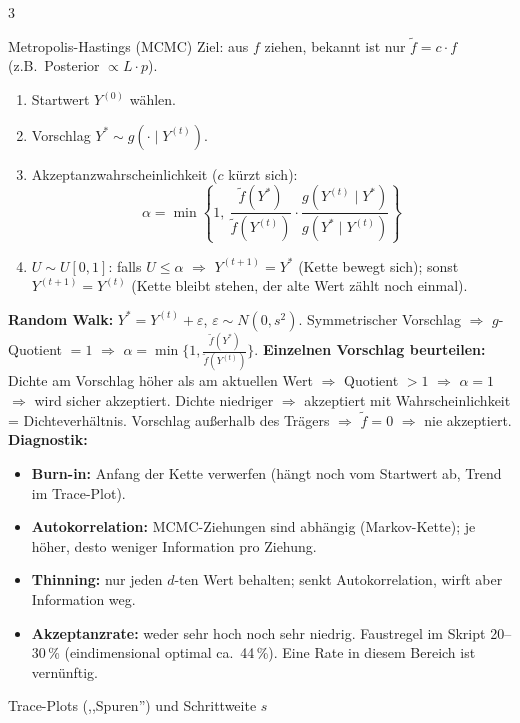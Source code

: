 \documentclass[8pt,a4paper,landscape]{extarticle}
\newcommand{\ra}{$\Rightarrow$}
\begin{document}
\begin{multicols*}{3}
\begin{wissen}{Metropolis-Hastings (MCMC)}
Ziel: aus $f$ ziehen, bekannt ist nur $\tilde f=c\cdot f$ (z.B.\ Posterior $\propto L\cdot p$).
\begin{enumerate}[leftmargin=10pt]
\item Startwert $Y^{(0)}$ wählen.
\item Vorschlag $Y^*\sim g(\cdot\mid Y^{(t)})$.
\item Akzeptanzwahrscheinlichkeit ($c$ kürzt sich):
$$\alpha=\min\left\{1,\ \frac{\tilde f(Y^*)}{\tilde f(Y^{(t)})}\cdot\frac{g(Y^{(t)}\mid Y^*)}{g(Y^*\mid Y^{(t)})}\right\}$$
\item $U\sim U[0,1]$: falls $U\le\alpha$ \ra{} $Y^{(t+1)}=Y^*$ (Kette bewegt sich); sonst $Y^{(t+1)}=Y^{(t)}$ (Kette bleibt stehen, der alte Wert zählt noch einmal).
\end{enumerate}
\textbf{Random Walk:} $Y^*=Y^{(t)}+\varepsilon$, $\varepsilon\sim N(0,s^2)$. Symmetrischer Vorschlag \ra{} $g$-Quotient $=1$ \ra{} $\alpha=\min\big\{1,\frac{\tilde f(Y^*)}{\tilde f(Y^{(t)})}\big\}$.
\textbf{Einzelnen Vorschlag beurteilen:} Dichte am Vorschlag höher als am aktuellen Wert \ra{} Quotient $>1$ \ra{} $\alpha=1$ \ra{} wird sicher akzeptiert. Dichte niedriger \ra{} akzeptiert mit Wahrscheinlichkeit = Dichteverhältnis. Vorschlag außerhalb des Trägers \ra{} $\tilde f=0$ \ra{} nie akzeptiert.
\textbf{Diagnostik:}
\begin{itemize}
\item \textbf{Burn-in:} Anfang der Kette verwerfen (hängt noch vom Startwert ab, Trend im Trace-Plot).
\item \textbf{Autokorrelation:} MCMC-Ziehungen sind abhängig (Markov-Kette); je höher, desto weniger Information pro Ziehung.
\item \textbf{Thinning:} nur jeden $d$-ten Wert behalten; senkt Autokorrelation, wirft aber Information weg.
\item \textbf{Akzeptanzrate:} weder sehr hoch noch sehr niedrig. Faustregel im Skript 20--30\,\% (eindimensional optimal ca.\ 44\,\%). Eine Rate in diesem Bereich ist vernünftig.
\end{itemize}
\end{wissen}
\begin{rechnen}{Trace-Plots (,,Spuren'') und Schrittweite $s$}
\begin{center}
\end{center}
\end{rechnen}
\end{multicols*}
\end{document}
